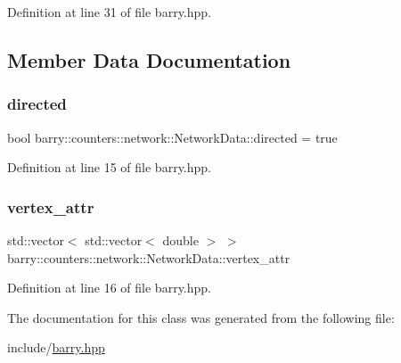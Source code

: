 Definition at line 31 of file barry.\+hpp.



\subsection{Member Data Documentation}
\mbox{\label{classbarry_1_1counters_1_1network_1_1_network_data_a9262461efbee895496824c0d09e1abbc}} 
\subsubsection{\texorpdfstring{directed}{directed}}
{\footnotesize\ttfamily bool barry\+::counters\+::network\+::\+Network\+Data\+::directed = true}



Definition at line 15 of file barry.\+hpp.

\mbox{\label{classbarry_1_1counters_1_1network_1_1_network_data_ac3a4971ef7e4b087b29cf30e7ddb0ea8}} 
\subsubsection{\texorpdfstring{vertex\+\_\+attr}{vertex\_attr}}
{\footnotesize\ttfamily std\+::vector$<$ std\+::vector$<$ double $>$ $>$ barry\+::counters\+::network\+::\+Network\+Data\+::vertex\+\_\+attr}



Definition at line 16 of file barry.\+hpp.



The documentation for this class was generated from the following file\+:\begin{DoxyCompactItemize}
\item 
include/\hyperlink{barry_8hpp}{barry.\+hpp}\end{DoxyCompactItemize}
